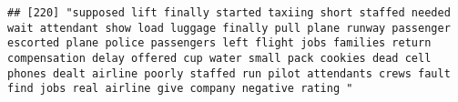 \documentclass[
]{article}
\begin{document}
\begin{verbatim}
## [220] "supposed lift finally started taxiing short staffed needed wait attendant show load luggage finally pull plane runway passenger escorted plane police passengers left flight jobs families return compensation delay offered cup water small pack cookies dead cell phones dealt airline poorly staffed run pilot attendants crews fault find jobs real airline give company negative rating "                                                                                                                                                                                                                                                                                                                                                                                                                                                                                                                                                                                                                                                                                                                                                                                                                                                                                                                                                                                                                                                                                                                                                                                                                                                                                                                                                                                                 

\end{verbatim}
\end{document}
